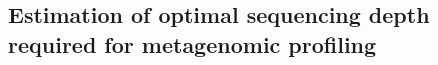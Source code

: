 \documentclass[11pt]{article}
\begin{document}
    \subsection{Estimation of optimal sequencing depth required for metagenomic profiling}
\end{document}
